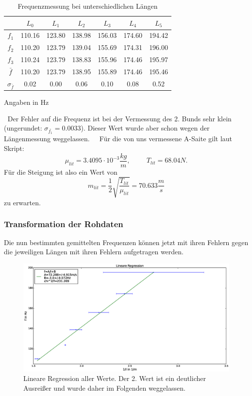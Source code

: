 \documentclass[12pt,a4paper]{article}
\begin{document}
\begin{table}[H]\centering
\caption{Frequenzmessung bei unterschiedlichen Längen}
\begin{tabular}{c|cccccc}
 & $L_0$ & $L_1$ & $L_2$ & $L_3$ & $L_4$ & $L_5$ \\ 
\hline 
$f_1$ & 110.16 & 123.80 & 138.98 & 156.03 & 174.60 & 194.42 \\ 
$f_2$ & 110.20 & 123.79 & 139.04 & 155.69 & 174.31 & 196.00 \\ 
$f_3$ & 110.24 & 123.79 & 138.83 & 155.96 & 174.46 & 195.97 \\ 
$\bar{f}$ & 110.20 & 123.79 & 138.95 & 155.89 & 174.46 & 195.46 \\ 
$\sigma_{\bar{f}}$ & 0.02 & 0.00 & 0.06  & 0.10 & 0.08  & 0.52  \\ 
\end{tabular}
\newline 
Angaben in Hz
\end{table}
$~$\newline
Der Fehler auf die Frequenz ist bei der Vermessung des 2. Bunds sehr klein (ungerundet: $\sigma_{\bar{f_1}}=0.0033$). Dieser Wert wurde aber schon wegen der Längenmessung weggelassen.
$~$\newline
$~$\newline
Für die von uns vermessene A-Saite gilt laut Skript:
\begin{equation*}
\mu_{lit}=3.4095 \cdot 10^{-3} \frac{kg}{m}, \hspace{1cm}
T_{lit}=68.04 N.
\end{equation*}
Für die Steigung ist also ein Wert von
\begin{equation}
m_{lit}=\frac{1}{2}\sqrt{\frac{T_{lit}}{\mu_{lit}}}=70.633 \frac{m}{s}
\label{Herstellerangabe Gitarre}
\end{equation}
zu erwarten.
\subsubsection{Transformation der Rohdaten}
Die nun bestimmten gemittelten Frequenzen können jetzt mit ihren Fehlern gegen die jeweiligen Längen mit ihren Fehlern aufgetragen werden.
\begin{figure}[H]\centering
\includegraphics[scale=0.4]{Bilder/lin_reg_mit.eps}
\caption{Lineare Regression aller Werte. Der 2. Wert ist ein deutlicher Ausreißer und wurde daher im Folgenden weggelassen.}
\end{figure}
\end{document}
